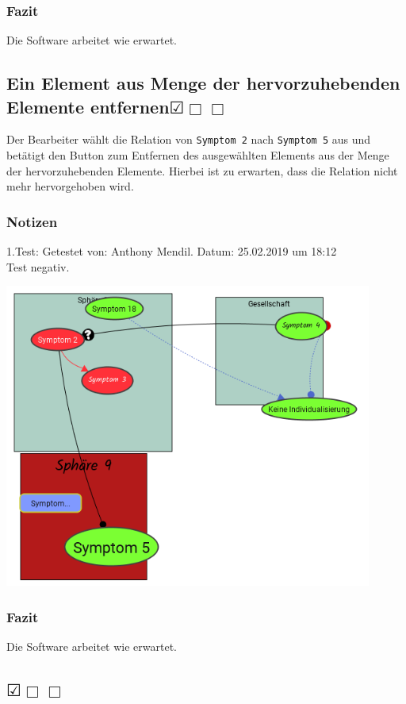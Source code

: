 \documentclass{scrartcl}
\newcommand{\subsectiont}[2]{\subsection[#1]{#1{\normalsize\normalfont #2}}}
\newcommand{\leer}{$\Box$}
\newcommand{\ok}{$\CheckedBox$}
\begin{document}
\subsubsection{Fazit}
Die Software arbeitet wie erwartet.

\subsectiont{Ein Element aus Menge der hervorzuhebenden \\Elemente entfernen}{\dotfill\ok\leer\leer}
Der Bearbeiter wählt die Relation von \texttt{Symptom 2} nach \texttt{Symptom 5} aus und betätigt den Button zum Entfernen des ausgewählten Elements aus der Menge der hervorzuhebenden Elemente. Hierbei ist zu erwarten, dass die Relation nicht mehr hervorgehoben wird. 
\subsubsection{Notizen}
1.Test: Getestet von: Anthony Mendil. Datum: 25.02.2019 um 18:12  \\
Test negativ. 
\begin{center}
\includegraphics[height=10cm]{3_57.PNG}
\end{center}
\subsubsection{Fazit}
Die Software arbeitet wie erwartet.

\subsectiont{}{\dotfill\ok\leer\leer}
\end{document}
